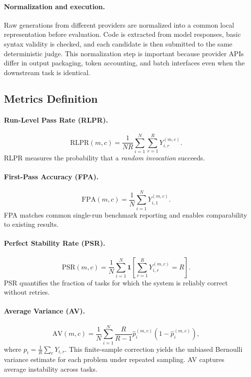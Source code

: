 \documentclass[11pt]{article}
\begin{document}
\paragraph{Normalization and execution.} Raw generations from different providers are normalized into a common local representation before evaluation. Code is extracted from model responses, basic syntax validity is checked, and each candidate is then submitted to the same deterministic judge. This normalization step is important because provider APIs differ in output packaging, token accounting, and batch interfaces even when the downstream task is identical.

\subsection{Metrics Definition}

\paragraph{Run-Level Pass Rate (RLPR).}
$$
\mathrm{RLPR}(m,c)=\frac{1}{NR}\sum_{i=1}^{N}\sum_{r=1}^{R} Y_{i,r}^{(m,c)}.
$$
RLPR measures the probability that a \emph{random invocation} succeeds.

\paragraph{First-Pass Accuracy (FPA).}
$$
\mathrm{FPA}(m,c)=\frac{1}{N}\sum_{i=1}^{N} Y_{i,1}^{(m,c)}.
$$
FPA matches common single-run benchmark reporting and enables comparability to existing results.

\paragraph{Perfect Stability Rate (PSR).}
$$
\mathrm{PSR}(m,c)=\frac{1}{N}\sum_{i=1}^{N} \mathbf{1}\!\left[\sum_{r=1}^{R} Y_{i,r}^{(m,c)}=R\right].
$$
PSR quantifies the fraction of tasks for which the system is reliably correct without retries.

\paragraph{Average Variance (AV).}
$$
\mathrm{AV}(m,c)=\frac{1}{N}\sum_{i=1}^{N} \frac{R}{R-1}\hat{p}_i^{(m,c)}\!\left(1-\hat{p}_i^{(m,c)}\right),
$$
where $\hat{p}_i = \frac{1}{R}\sum_r Y_{i,r}$. This finite-sample correction yields the unbiased Bernoulli variance estimate for each problem under repeated sampling. AV captures average instability across tasks.
\end{document}
